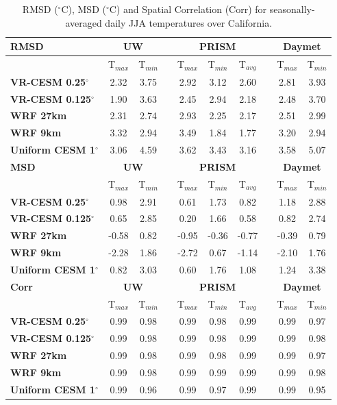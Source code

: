 \begin{table}
\begin{center}
\caption{RMSD ($^\circ$C), MSD ($^\circ$C) and Spatial Correlation (Corr) for seasonally-averaged daily JJA temperatures over California. } \label{tab:stat_JJA_t2}
\begin{tabular*}{5.5in}{l @{\extracolsep{\fill}}ccccccccc}
\hline \textbf{RMSD} & \multicolumn{2}{c}{\textbf{UW}}  & & \multicolumn{3}{c}{\textbf{PRISM}} & & \multicolumn{2}{c}{\textbf{Daymet}} \\
\hline & T$_{max}$ &  T$_{min}$ & & T$_{max}$ & T$_{min}$ & T$_{avg}$& & T$_{max}$ & T$_{min}$\\
\hline \textbf{VR-CESM 0.25$^\circ$} & 2.32 & 3.75 & & 2.92 & 3.12 & 2.60 & & 2.81 & 3.93 \\
\textbf{VR-CESM 0.125$^\circ$} \quad & 1.90 & 3.63 & & 2.45 & 2.94 & 2.18 & & 2.48 & 3.70 \\
\textbf{WRF 27km} & 2.31 & 2.74 & & 2.93 & 2.25 & 2.17 & & 2.51 & 2.99 \\
\textbf{WRF 9km} & 3.32 & 2.94 & & 3.49 & 1.84 & 1.77 & & 3.20 & 2.94 \\
\textbf{Uniform CESM 1$^\circ$} & 3.06 & 4.59 & & 3.62 & 3.43 & 3.16 & & 3.58 & 5.07 \\
\hline \hline \textbf{MSD} & \multicolumn{2}{c}{\textbf{UW}}  & & \multicolumn{3}{c}{\textbf{PRISM}} & & \multicolumn{2}{c}{\textbf{Daymet}} \\\hline & T$_{max}$ &  T$_{min}$ && T$_{max}$ & T$_{min}$ & T$_{avg}$&& T$_{max}$ &  T$_{min}$\\
\hline \textbf{VR-CESM 0.25$^\circ$} & 0.98 & 2.91 & & 0.61 & 1.73 & 0.82 & & 1.18 & 2.88 \\
\textbf{VR-CESM 0.125$^\circ$} \quad & 0.65 & 2.85 & & 0.20 & 1.66 & 0.58 & & 0.82 & 2.74 \\
\textbf{WRF 27km} & -0.58 & 0.82 & & -0.95 & -0.36 & -0.77 & & -0.39 & 0.79 \\
\textbf{WRF 9km} & -2.28 & 1.86 & & -2.72 & 0.67 & -1.14 & & -2.10 & 1.76 \\
\textbf{Uniform CESM 1$^\circ$} & 0.82 & 3.03 & & 0.60 & 1.76 & 1.08 & & 1.24 & 3.38 \\
\hline \hline \textbf{Corr} & \multicolumn{2}{c}{\textbf{UW}}  & & \multicolumn{3}{c}{\textbf{PRISM}} & & \multicolumn{2}{c}{\textbf{Daymet}} \\\hline & T$_{max}$ &  T$_{min}$ && T$_{max}$ & T$_{min}$ & T$_{avg}$&& T$_{max}$ &  T$_{min}$\\
\hline \textbf{VR-CESM 0.25$^\circ$} & 0.99 & 0.98 & & 0.99 & 0.98 & 0.99 & & 0.99 & 0.97 \\
\textbf{VR-CESM 0.125$^\circ$} \quad & 0.99 & 0.98 & & 0.99 & 0.98 & 0.99 & & 0.99 & 0.98 \\
\textbf{WRF 27km} & 0.99 & 0.98 & & 0.99 & 0.98 & 0.99 & & 0.99 & 0.97 \\
\textbf{WRF 9km} & 0.99 & 0.98 & & 0.99 & 0.99 & 0.99 & & 0.99 & 0.98 \\
\textbf{Uniform CESM 1$^\circ$} & 0.99 & 0.96 & & 0.99 & 0.97 & 0.99 & & 0.99 & 0.95 \\
\hline
\end{tabular*}
\end{center}
\end{table}
